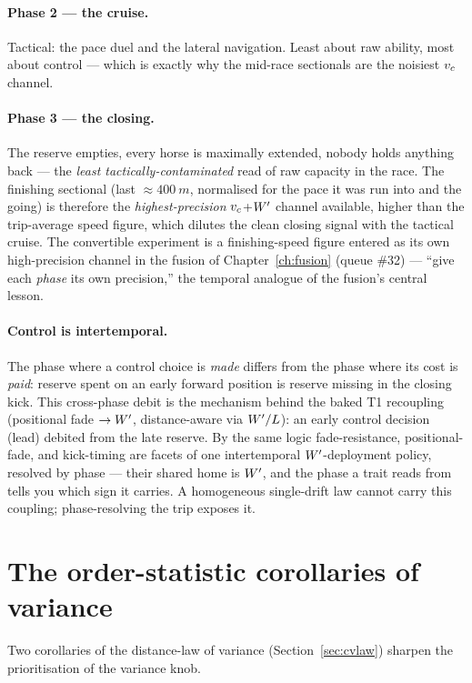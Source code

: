 \paragraph{Phase 2 --- the cruise.} Tactical: the pace duel and the lateral navigation. Least about
raw ability, most about control --- which is exactly why the mid-race sectionals are the noisiest
${v_{c}}$ channel.

\paragraph{Phase 3 --- the closing.} The reserve empties, every horse is maximally extended, nobody
holds anything back --- the \emph{least tactically-contaminated} read of raw capacity in the race.
The finishing sectional (last $\approx\SI{400}{m}$, normalised for the pace it was run into and the
going) is therefore the \emph{highest-precision} ${v_{c}}$+${W^{\prime}}$ channel available, higher than the
trip-average speed figure, which dilutes the clean closing signal with the tactical cruise. The
convertible experiment is a finishing-speed figure entered as its own high-precision channel in the
fusion of Chapter~\ref{ch:fusion} (queue \#32) --- ``give each \emph{phase} its own precision,'' the
temporal analogue of the fusion's central lesson.

\paragraph{Control is intertemporal.} The phase where a control choice is \emph{made} differs from
the phase where its cost is \emph{paid}: reserve spent on an early forward position is reserve
missing in the closing kick. This cross-phase debit is the mechanism behind the baked T1 recoupling
(positional fade $\to {W^{\prime}}$, distance-aware via ${W^{\prime}}/L$): an early control decision (lead) debited
from the late reserve. By the same logic fade-resistance, positional-fade, and kick-timing are
facets of one intertemporal ${W^{\prime}}$-deployment policy, resolved by phase --- their shared home is
${W^{\prime}}$, and the phase a trait reads from tells you which sign it carries. A homogeneous single-drift
law cannot carry this coupling; phase-resolving the trip exposes it.

\section{The order-statistic corollaries of variance}
\label{sec:evt}

Two corollaries of the distance-law of variance (Section~\ref{sec:cvlaw}) sharpen the prioritisation
of the variance knob.

